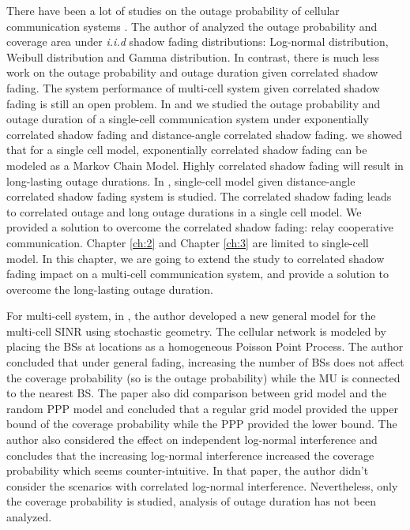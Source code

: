 \par There have been a lot of studies on the outage probability of cellular communication systems \cite{abu1991outage, petrovic2013outage, emamian2014outage}. The author of \cite{vural2015effect} analyzed the outage probability and coverage area under \emph{i.i.d} shadow fading distributions: Log-normal distribution, Weibull distribution and Gamma distribution. In contrast, there is much less work on the outage probability and outage duration given correlated shadow fading. The system performance of multi-cell system given correlated shadow fading is still an open problem. In \cite{lu2015long} and \cite{lu2015shining} we studied the outage probability and outage duration of a single-cell communication system under exponentially correlated shadow fading and distance-angle correlated shadow fading. \cite{lu2015long} we showed that for a single cell model, exponentially correlated shadow fading can be modeled as a Markov Chain Model. Highly correlated shadow fading will result in long-lasting outage durations. In \cite{lu2015shining}, single-cell model given distance-angle correlated shadow fading system is studied. The correlated shadow fading leads to correlated outage and long outage durations in a single cell model. We provided a solution to overcome the correlated shadow fading: relay cooperative communication. Chapter \ref{ch:2} and Chapter \ref{ch:3} are limited to single-cell model. In this chapter, we are going to extend the study to correlated shadow fading impact on a multi-cell communication system, and provide a solution to overcome the long-lasting outage duration.
\par For multi-cell system, in \cite{andrews2011tractable}, the author developed a new general model for the multi-cell SINR using stochastic geometry. The cellular network is modeled by placing the BSs at locations as a homogeneous Poisson Point Process. The author concluded that under general fading, increasing the number of BSs does not affect the coverage probability (so is the outage probability) while the MU is connected to the nearest BS. The paper also did comparison between grid model and the random PPP model and concluded that a regular grid model provided the upper bound of the coverage probability while the PPP provided the lower bound. The author also considered the effect on independent log-normal interference and concludes that the increasing log-normal interference increased the coverage probability which seems counter-intuitive. In that paper, the author didn't consider the scenarios with correlated log-normal interference. Nevertheless, only the coverage probability is studied, analysis of outage duration has not been analyzed. 
